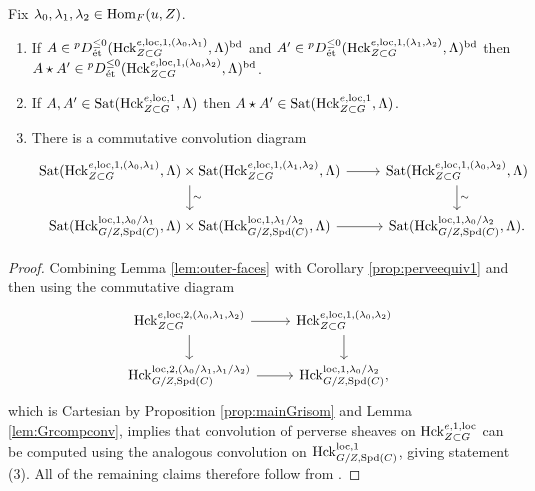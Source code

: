  \begin{prop}\label{prop:pervconv} Fix $\lambda_{0}, \lambda_{1},\lambda_{2} \in \mathrm{Hom}_{F}(u,Z)$.
     \begin{enumerate}
         \item{If $A \in {^{p}D}^{\leq 0}_{\textnormal{\'{e}t}}(\mathrm{Hck}_{Z \subset G}^{e,\mathrm{loc},1,(\lambda_{0},\lambda_{1})},\Lambda)^{\textnormal{bd}}$ and $A' \in {^{p}D}^{\leq 0}_{\textnormal{\'{e}t}}(\mathrm{Hck}_{Z \subset G}^{e,\mathrm{loc},1,(\lambda_{1},\lambda_{2})},\Lambda)^{\textnormal{bd}}$ then $A \star A' \in {^{p}D}^{\leq 0}_{\textnormal{\'{e}t}}(\mathrm{Hck}_{Z \subset G}^{e,\mathrm{loc},1,(\lambda_{0},\lambda_{2})},\Lambda)^{\textnormal{bd}}$.}
\item{If $A,A' \in \textnormal{Sat}(\mathrm{Hck}_{Z \subset G}^{e,\mathrm{loc},1},\Lambda)$ then $A \star A' \in \textnormal{Sat}(\mathrm{Hck}_{Z \subset G}^{e,\mathrm{loc},1},\Lambda)$.}
         \item{There is a commutative convolution diagram
    \[
    \begin{tikzcd}
       \tn{Sat}(\Hck^{e,\loc,1,(\lambda_{0},\lambda_{1})}_{Z \subset G},\Lambda)\times \tn{Sat}( \Hck^{e,\loc,1,(\lambda_{1},\lambda_{2})}_{Z \subset G},\Lambda) \arrow{r} \arrow["\sim"]{d} &  \tn{Sat}(\tn{Hck}_{Z \subset G}^{e,\loc,1,(\lambda_{0},\lambda_{2})},\Lambda) \arrow["\sim"]{d} \\
        \tn{Sat}(\Hck^{\loc,1,\lambda_{0}/
\lambda_{1}}_{G/Z,\Spd(C)},\Lambda) \times \tn{Sat}(\Hck^{\loc,1,\lambda_{1}/
\lambda_{2}}_{G/Z,\Spd(C)},\Lambda) \arrow{r}  & \tn{Sat}(\Hck^{\loc,1,\lambda_{0}/\lambda_{2}
}_{G/Z,\Spd(C)},\Lambda).
\end{tikzcd}
\]}

     \end{enumerate}
 \end{prop}

 \begin{proof}
     Combining Lemma \ref{lem:outer-faces} with Corollary \ref{prop:perveequiv1} and then using the commutative diagram
     \[
     \begin{tikzcd}
     \Hck_{Z \subset G}^{e,\loc,2,(\lambda_{0},\lambda_{1},\lambda_{2})} \arrow{d} \arrow{r} & \Hck_{Z \subset G}^{e,\loc,1,(\lambda_{0},\lambda_{2})} \arrow{d} \\
\Hck_{G/Z,\Spd(C)}^{\loc,2,(\lambda_{0}/\lambda_{1},\lambda_{1}/\lambda_{2})} \arrow{r} & \Hck_{G/Z,\Spd(C)}^{\loc,1,\lambda_{0}/\lambda_{2}},
     \end{tikzcd}
     \]
     which is Cartesian by Proposition \ref{prop:mainGrisom} and Lemma \ref{lem:Grcompconv}, implies that convolution of perverse sheaves on $\mathrm{Hck}_{Z \subset G}^{e,1,\mathrm{loc}}$ can be computed using the analogous convolution on $\mathrm{Hck}_{G/Z,\mathrm{Spd}(C)}^{\mathrm{loc},1}$, giving statement (3).  All of the remaining claims therefore follow from \cite[Proposition VI.8.1]{Geometrization}.
 \end{proof}


